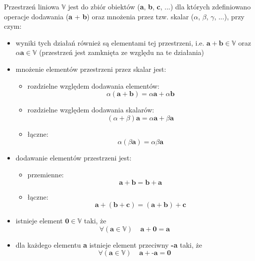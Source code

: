 \documentclass[12pt,a4paper,twoside,openany]{book}
\begin{document}
Przestrzeń liniowa $\mathbb{V}$ jest do zbiór obiektów (\textbf{a}, \textbf{b}, \textbf{c}, ...) dla których zdefiniowano operacje dodawania (\textbf{a} + \textbf{b}) oraz mnożenia przez tzw. skalar ($\alpha$, $\beta$, $\gamma$, ...), przy czym: \newline
\begin{itemize}
    \item wyniki tych działań również są elementami tej przestrzeni, i.e. $\textbf{a} + \textbf{b} \in \mathbb{V}$ oraz $\alpha\textbf{a} \in \mathbb{V}$ (przestrzeń jest zamknięta ze względu na te działania) \newline
    \item mnożenie elementów przestrzeni przez skalar jest:
    \begin{itemize}
        \item rozdzielne względem dodawania elementów:
        \begin{equation}
         \alpha(\textbf{a} + \textbf{b}) = \alpha\textbf{a} + \alpha\textbf{b}
         \end{equation}
         \item rozdzielne względem dodawania skalarów:
         \begin{equation}
         (\alpha + \beta)\textbf{a} = \alpha\textbf{a} + \beta\textbf{a}
         \end{equation}
         \item łączne:
         \begin{equation}
         \alpha(\beta\textbf{a}) = \alpha\beta\textbf{a}
         \end{equation}
         
    \end{itemize}
    \item dodawanie elementów przestrzeni jest:
    \begin{itemize}
        \item przemienne:
        \begin{equation}
        \textbf{a} + \textbf{b} = \textbf{b} + \textbf{a}
         \end{equation}
        \item łączne:
        \begin{equation}
        \textbf{a} + (\textbf{b} + \textbf{c}) = (\textbf{a} + \textbf{b}) + \textbf{c}
        \end{equation}
    \end{itemize}
    \item istnieje element $\textbf{0}\in\mathbb{V}$ taki, że
    \begin{equation}
    \forall(\textbf{a}\in\mathbb{V}) \;\;\;\;
    \textbf{a} + \textbf{0} = \textbf{a}
     \end{equation}
    \item dla każdego elementu \textbf{a} istnieje element przeciwny
    \textbf{-a} taki, że
    \begin{equation}
    \forall(\textbf{a}\in\mathbb{V}) \;\;\;\;
    \textbf{a} + \textbf{-a} = \textbf{0}
    \end{equation}
\end{itemize}
\end{document}
